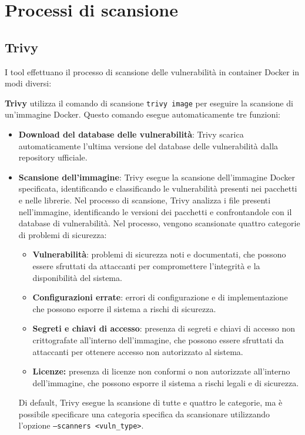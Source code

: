 \section{Processi di scansione}
\subsection{Trivy}
I tool effettuano il processo di scansione delle vulnerabilità in container Docker in modi diversi:

\textbf{Trivy} utilizza il comando di scansione \texttt{trivy image} per eseguire la scansione di un'immagine Docker. Questo comando esegue automaticamente tre funzioni:
\begin{itemize}
   \item \textbf{Download del database delle vulnerabilità}: Trivy scarica automaticamente l'ultima versione del database delle vulnerabilità dalla repository ufficiale.
   \item \textbf{Scansione dell'immagine}: Trivy esegue la scansione dell'immagine Docker specificata, identificando e classificando le vulnerabilità presenti nei pacchetti e nelle librerie. Nel processo di scansione, Trivy analizza i file presenti nell'immagine, identificando le versioni dei pacchetti e confrontandole con il database di vulnerabilità. Nel processo, vengono scansionate quattro categorie di problemi di sicurezza:
         \begin{itemize}
            \item \textbf{Vulnerabilità}: problemi di sicurezza noti e documentati, che possono essere sfruttati da attaccanti per compromettere l'integrità e la disponibilità del sistema.
            \item \textbf{Configurazioni errate}: errori di configurazione e di implementazione che possono esporre il sistema a rischi di sicurezza.
            \item \textbf{Segreti e chiavi di accesso}: presenza di segreti e chiavi di accesso non crittografate all'interno dell'immagine, che possono essere sfruttati da attaccanti per ottenere accesso non autorizzato al sistema.
            \item \textbf{Licenze:} presenza di licenze non conformi o non autorizzate all'interno dell'immagine, che possono esporre il sistema a rischi legali e di sicurezza.
         \end{itemize}
         Di default, Trivy esegue la scansione di tutte e quattro le categorie, ma è possibile specificare una categoria specifica da scansionare utilizzando l'opzione \texttt{--scanners <vuln\_type>}.


\end{itemize}
